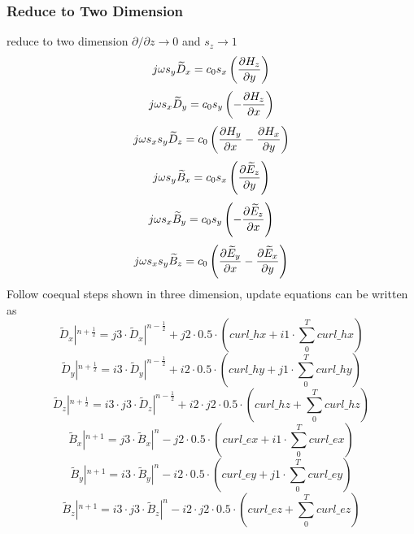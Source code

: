\subsubsection{Reduce to Two Dimension}
reduce to two dimension $\partial / \partial z \rightarrow 0$ and $s_z \rightarrow 1$
\begin{equation}
  j\omega s_y \widetilde{D}_x = c_0 s_x \left( \frac{\partial H_z}{\partial y}\right)
\end{equation}
\begin{equation}
  j\omega s_x \widetilde{D}_y = c_0 s_y \left(- \frac{\partial H_z}{\partial x}\right)
\end{equation}
\begin{equation}
  j\omega s_x s_y \widetilde{D}_z = c_0 \left( \frac{\partial H_y}{\partial x} - \frac{\partial H_x}{\partial y}\right)
\end{equation}
\begin{equation}
  j\omega s_y \widetilde{B}_x = c_0 s_x \left( \frac{\partial \widetilde{E}_z}{\partial y}\right)
\end{equation}
\begin{equation}
  j\omega s_x \widetilde{B}_y = c_0 s_y \left(- \frac{\partial \widetilde{E}_z}{\partial x}\right)
\end{equation}
\begin{equation}
  j\omega s_x s_y \widetilde{B}_z = c_0 \left( \frac{\partial \widetilde{E}_y}{\partial x} - \frac{\partial \widetilde{E}_x}{\partial y}\right)
\end{equation}
Follow coequal steps shown in three dimension, update equations can be written as 
\begin{equation}
  \widetilde{D}_x|^{n+\frac{1}{2}} = j3 \cdot \widetilde{D}_x|^{n-\frac{1}{2}} + j2 \cdot 0.5 \cdot \left( curl\_hx + i1 \cdot \sum_0^T curl\_hx \right)
\end{equation}
\begin{equation}
  \widetilde{D}_y|^{n+\frac{1}{2}} = i3 \cdot \widetilde{D}_y|^{n-\frac{1}{2}} + i2 \cdot 0.5 \cdot \left( curl\_hy + j1 \cdot \sum_0^T curl\_hy \right)
\end{equation}
\begin{equation}
  \widetilde{D}_z|^{n+\frac{1}{2}} = i3 \cdot j3 \cdot \widetilde{D}_z|^{n-\frac{1}{2}} + i2 \cdot j2 \cdot 0.5 \cdot \left( curl\_hz + \sum_0^T curl\_hz \right)
\end{equation}
\begin{equation}
  \widetilde{B}_x|^{n+1} = j3 \cdot \widetilde{B}_x|^{n} - j2 \cdot 0.5 \cdot \left( curl\_ex + i1 \cdot \sum_0^T curl\_ex \right)
\end{equation}
\begin{equation}
  \widetilde{B}_y|^{n+1} = i3 \cdot \widetilde{B}_y|^{n} - i2 \cdot 0.5 \cdot \left( curl\_ey + j1 \cdot \sum_0^T curl\_ey \right)
\end{equation}
\begin{equation}
  \widetilde{B}_z|^{n+1} = i3 \cdot j3 \cdot \widetilde{B}_z|^{n} - i2 \cdot j2 \cdot 0.5 \cdot \left( curl\_ez + \sum_0^T curl\_ez \right)
\end{equation}




